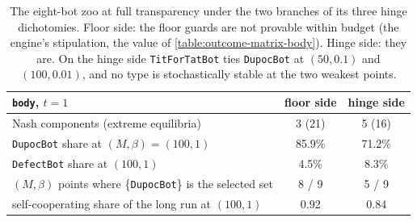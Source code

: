 \begin{table}[t]
\centering
\begin{tabular}{lcc}
\toprule
\texttt{body}, $t = 1$ & floor side & hinge side \\
\midrule
Nash components (extreme equilibria) & 3 (21) & 5 (16) \\
\texttt{DupocBot} share at $(M,\beta) = (100, 1)$ & 85.9\% & 71.2\% \\
\texttt{DefectBot} share at $(100, 1)$ & 4.5\% & 8.3\% \\
$(M,\beta)$ points where \{\texttt{DupocBot}\} is the selected set & 8 / 9 & 5 / 9 \\
self-cooperating share of the long run at $(100, 1)$ & 0.92 & 0.84 \\
\bottomrule
\end{tabular}
\caption{The eight-bot zoo at full transparency under the two branches of its three hinge dichotomies. Floor side: the floor guards are not provable within budget (the engine's stipulation, the value of \cref{table:outcome-matrix-body}). Hinge side: they are. On the hinge side \texttt{TitForTatBot} ties \texttt{DupocBot} at $(50, 0.1)$ and $(100, 0.01)$, and no type is stochastically stable at the two weakest points.}
\label{tab:hinge-body}
\end{table}

